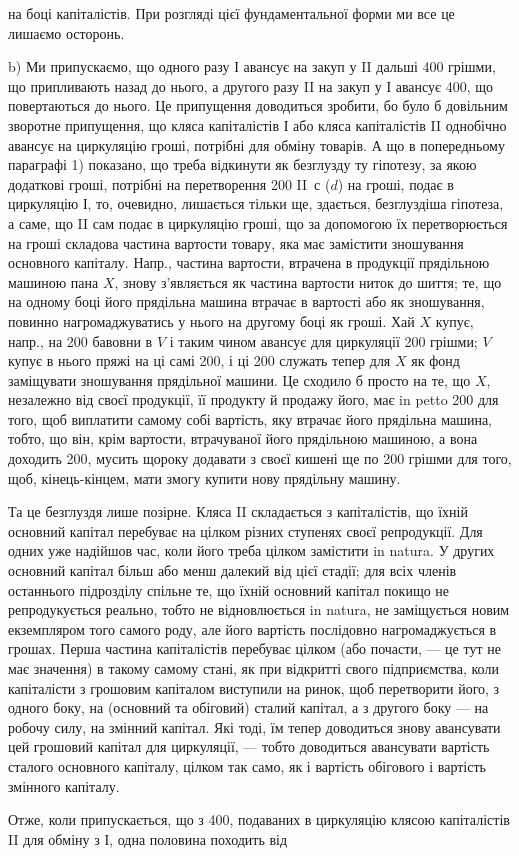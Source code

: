 \parcont{}  %
на боці капіталістів. При розгляді цієї фундаментальної форми ми все це
лишаємо осторонь.

b) Ми припускаємо, що одного разу І авансує на закуп у II дальші
400 грішми, що припливають назад до нього, а другого разу
II на закуп у І авансує 400, що повертаються до нього. Це
припущення доводиться зробити, бо було б довільним зворотне припущення,
що кляса капіталістів І або кляса капіталістів II однобічно авансує
на циркуляцію гроші, потрібні для обміну товарів. А що в попередньому
параграфі 1) показано, що треба відкинути як безглузду ту гіпотезу, за
якою додаткові гроші, потрібні на перетворення 200 II~$с$ ($d$) на гроші,
подає в циркуляцію І, то, очевидно, лишається тільки ще, здається, безглуздіша
гіпотеза, а саме, що II сам подає в циркуляцію гроші, що за допомогою
їх перетворюється на гроші складова частина вартости товару,
яка має замістити зношування основного капіталу. Напр., частина вартости,
втрачена в продукції прядільною машиною пана $X$, знову з’являється
як частина вартости ниток до шиття; те, що на одному боці його прядільна
машина втрачає в вартості або як зношування, повинно нагромаджуватись
у нього на другому боці як гроші. Хай $X$ купує, напр., на
200 бавовни в $V$ і таким чином авансує для циркуляції 200 грішми; $V$ купує в нього пряжі на ці самі 200, і ці
200 служать тепер для $X$ як фонд заміщувати зношування прядільної
машини. Це сходило б просто на те, що $X$, незалежно від своєї
продукції, її продукту й продажу його, має in petto 200 для
того, щоб виплатити самому собі вартість, яку втрачає його прядільна
машина, тобто, що він, крім вартости, втрачуваної його прядільною машиною,
а вона доходить 200, мусить щороку додавати з своєї
кишені ще по 200 грішми для того, щоб, кінець-кінцем, мати
змогу купити нову прядільну машину.

Та це безглуздя лише позірне. Кляса II складається з капіталістів,
що їхній основний капітал перебуває на цілком різних ступенях своєї
репродукції. Для одних уже надійшов час, коли його треба цілком замістити
in natura. У других основний капітал більш або менш далекий
від цієї стадії; для всіх членів останнього підрозділу спільне те, що їхній
основний капітал покищо не репродукується реально, тобто не відновлюється
in natura, не заміщується новим екземпляром того самого роду,
але його вартість послідовно нагромаджується в грошах. Перша частина
капіталістів перебуває цілком (або почасти, — це тут не має значення)
в такому самому стані, як при відкритті свого підприємства, коли капіталісти
з грошовим капіталом виступили на ринок, щоб перетворити його,
з одного боку, на (основний та обіговий) сталий капітал, а з другого
боку — на робочу силу, на змінний капітал. Які тоді, їм тепер доводиться
знову авансувати цей грошовий капітал для циркуляції, — тобто доводиться
авансувати вартість сталого основного капіталу, цілком так само, як і вартість
обігового і вартість змінного капіталу.

Отже, коли припускається, що з 400, подаваних в циркуляцію
клясою капіталістів II для обміну з І, одна половина походить від
\parbreak{}  %
